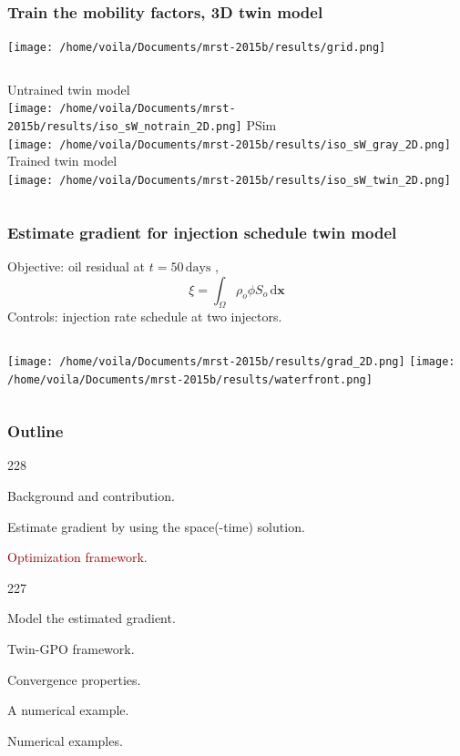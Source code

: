 \documentclass{beamer}
\newcommand{\barrow}{\item[\color{darkred}\ding{228}]}
\newcommand{\carrow}{\item[\color{darkred}\ding{227}]}
\begin{document}
\begin{frame}
    \frametitle{Train the mobility factors, 3D \hfill \scriptsize{twin model}}\scriptsize
    \begin{center}
        \texttt{[image: /home/voila/Documents/mrst-2015b/results/grid.png]}
    \end{center}
    \centering
    \begin{columns}
        \centering
        Untrained twin model\\
        \texttt{[image: /home/voila/Documents/mrst-2015b/results/iso\_sW\_notrain\_2D.png]}
        \centering
        PSim\\
        \texttt{[image: /home/voila/Documents/mrst-2015b/results/iso\_sW\_gray\_2D.png]}
        \centering
        Trained twin model\\
        \texttt{[image: /home/voila/Documents/mrst-2015b/results/iso\_sW\_twin\_2D.png]}
    \end{columns}
\end{frame}

\begin{frame}
    \frametitle{Estimate gradient for injection schedule \hfill\scriptsize{twin model}}\small
    Objective: oil residual at $t=50\, \textrm{days}$ , $$\xi = \int_\Omega \rho_o \phi S_o \,\textrm{d} \boldsymbol{x} $$
    Controls: injection rate schedule at two injectors.
    \begin{columns}
        \centering
        \texttt{[image: /home/voila/Documents/mrst-2015b/results/grad\_2D.png]}
        \centering
        \texttt{[image: /home/voila/Documents/mrst-2015b/results/waterfront.png]}
    \end{columns}
\end{frame}


\setcounter{framenumber}{31}
\begin{frame}
    \frametitle{Outline}\small
    \begin{dinglist}{228}
        \barrow {}Background and contribution.
        \barrow Estimate gradient by using the space(-time) solution.
        \barrow \textcolor{darkred}{Optimization framework.}
        \begin{dinglist}{227}
            \carrow Model the estimated gradient.
            \carrow Twin-GPO framework.
            \carrow Convergence properties.
            \carrow A numerical example.
        \end{dinglist}
        \barrow Numerical examples.
    \end{dinglist}
\end{frame}
\end{document}
